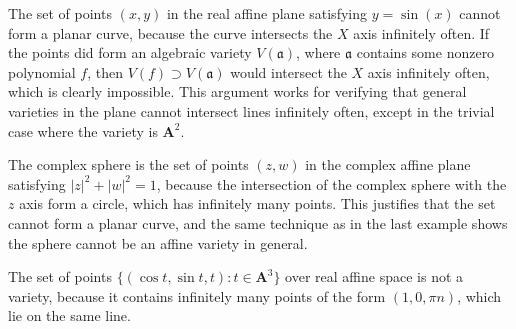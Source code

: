 \begin{example}
    The set of points $(x,y)$ in the real affine plane satisfying $y = \sin(x)$ cannot form a planar curve, because the curve intersects the $X$ axis infinitely often. If the points did form an algebraic variety $V(\mathfrak{a})$, where $\mathfrak{a}$ contains some nonzero polynomial $f$, then $V(f) \supset V(\mathfrak{a})$ would intersect the $X$ axis infinitely often, which is clearly impossible. This argument works for verifying that general varieties in the plane cannot intersect lines infinitely often, except in the trivial case where the variety is $\mathbf{A}^2$.
\end{example}

\begin{example}
    The complex sphere is the set of points $(z,w)$ in the complex affine plane satisfying $|z|^2 + |w|^2 = 1$, because the intersection of the complex sphere with the $z$ axis form a circle, which has infinitely many points. This justifies that the set cannot form a planar curve, and the same technique as in the last example shows the sphere cannot be an affine variety in general.
\end{example}

\begin{example}
    The set of points $\{ (\cos t, \sin t, t): t \in \mathbf{A}^3 \}$ over real affine space is not a variety, because it contains infinitely many points of the form $(1,0,\pi n)$, which lie on the same line.
\end{example}

